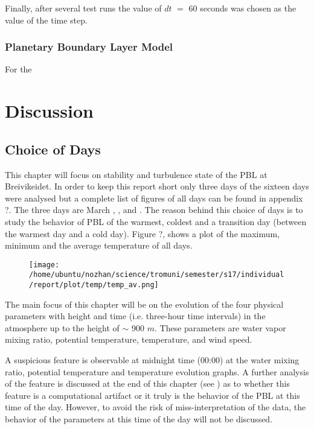 \documentclass[a4paper,12pt]{article}
\numberwithin{equation}{section} %
\begin{document}
\vspace{0.25cm}

Finally, after several test runs the value of $dt$ $=$ $60$ seconds was chosen as the value of the time step.

\subsubsection{Planetary Boundary Layer Model}

For the 

\newpage

\section{Discussion}

\subsection{Choice of Days}
This chapter will focus on stability and turbulence state of the PBL at Breivikeidet. In order to keep this report short only three days of the sixteen days were analysed but a complete list of figures of all days can be found in appendix ?. The three days are March , , and . The reason behind this choice of days is to study the behavior of PBL of the warmest, coldest and a transition day (between the warmest day and a cold day). Figure ?, shows a plot of the maximum, minimum and the average temperature of all days.

\begin{figure}[H]
	\texttt{[image: /home/ubuntu/nozhan/science/tromuni/semester/s17/individual/report/plot/temp/temp\_av.png]}
\end{figure}

The main focus of this chapter will be on the evolution of the four physical parameters with height and time (i.e. three-hour time intervals) in the atmosphere up to the height of $\sim$ 900 $m$. These parameters are water vapor mixing ratio, potential temperature, temperature, and wind speed.

A suspicious feature is observable at midnight time (00:00) at the water mixing ratio, potential temperature and temperature evolution graphs. A further analysis of the feature is discussed at the end of this chapter (see ) as to whether this feature is a computational artifact or it truly is the behavior of the PBL at this time of the day. However, to avoid the risk of miss-interpretation of the data, the behavior of the parameters at this time of the day will not be discussed.
\end{document}
